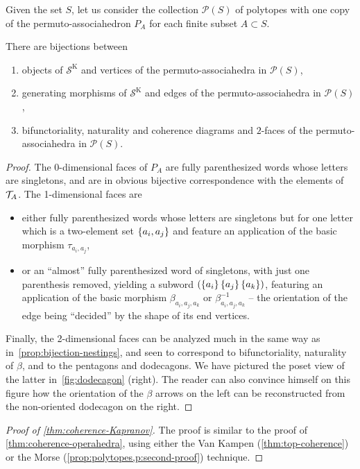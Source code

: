 Given the set $S$, let us consider the collection $\mathcal{P}(S)$ of polytopes with one copy of the permuto-associahedron $P_A$ for each finite subset $A \subset S$.
\begin{proposition}
\label{bijections-Kapranov}
    There are bijections between
\begin{enumerate}
    \item objects of $\mathcal{S}^{\mathrm{K}}$ and vertices of the permuto-associahedra in $\mathcal{P}(S)$,
    \item generating morphisms of $\mathcal{S}^{\mathrm{K}}$ and edges of the permuto-associahedra in $\mathcal{P}(S)$,
    \item bifunctoriality, naturality and coherence diagrams and $2$-faces of the permuto-associahedra in $\mathcal{P}(S)$.
\end{enumerate}
\end{proposition}
\begin{proof}
    The 0-dimensional faces of $P_A$ are fully parenthesized words whose letters are singletons, and are in obvious bijective correspondence with the elements of ${\cal T}_A$. 
The 1-dimensional faces are 
\begin{itemize}
\item
either fully parenthesized words whose letters are singletons but for one letter which is a two-element set $\left\{a_i,a_j\right\}$ and feature an application of the basic morphism $\tau_{a_i,a_j}$, 
\item or an ``almost'' fully parenthesized word of singletons, with just one parenthesis removed, yielding a subword $(\left\{a_i\right\} \left\{a_j\right\} \left\{a_k\right\})$, featuring an application of the basic morphism $\beta_{a_i,a_j,a_k}$ or $\beta_{a_i,a_j,a_k}^{-1}$
-- the orientation of the edge being ``decided'' by the shape of its end vertices.
\end{itemize}
Finally, the 2-dimensional faces can be analyzed much in the same way as in~\cref{prop:bijection-nestings}, and seen to correspond to bifunctoriality, naturality of $\beta$, and to the pentagons and dodecagons. 
We have pictured the poset view of the 
latter in~\cref{fig:dodecagon} (right). 
The reader can also convince himself on this figure how the orientation of the $\beta$ arrows on the left can be reconstructed from the non-oriented dodecagon on the right.
\end{proof}
\begin{proof}[Proof of \cref{thm:coherence-Kapranov}]
The proof is similar to the proof of \cref{thm:coherence-operahedra}, using either the Van Kampen (\cref{thm:top-coherence}) or the Morse (\cref{prop:polytopes,p:second-proof}) technique.
\end{proof}
